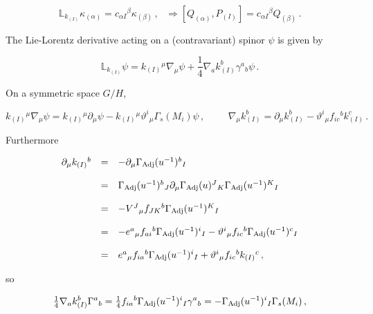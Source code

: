 \documentclass[12pt,a4paper]{article}
\begin{document}
\begin{equation}
\mathbb{L}_{k_{(I)}}\kappa_{(\alpha)}
=c_{\alpha I}{}^{\beta}\kappa_{(\beta)}\, ,  
\,\,\,\,
\Rightarrow
[Q_{(\alpha)},P_{(I)}]= c_{\alpha I}{}^{\beta} Q_{(\beta)}\, .
\end{equation}

The Lie-Lorentz derivative acting on a (contravariant) spinor $\psi$
is given by \cite{kn:Kos,kn:Kos2}

\begin{equation}
\mathbb{L}_{k_{(I)}}\psi = k_{(I)}{}^{\mu}\nabla_{\mu}\psi 
+{\textstyle\frac{1}{4}} \nabla_{a}k_{(I)}^{b}\gamma^{a}{}_{b}\psi\, .  
\end{equation}

\noindent
On a symmetric space $G/H$, 

\begin{equation}
k_{(I)}{}^{\mu}\nabla_{\mu}\psi = 
k_{(I)}{}^{\mu}\partial_{\mu}\psi -
k_{(I)}{}^{\mu}\vartheta^{i}{}_{\mu}\Gamma_{s}(M_{i})\psi\, ,
\hspace{1cm}
\nabla_{\mu}k_{(I)}^{b} = 
\partial_{\mu}k_{(I)}^{b} -\vartheta^{i}{}_{\mu}f_{ic}{}^{b}k_{(I)}^{c}\, .
\end{equation}

\noindent
Furthermore

\begin{equation}
  \begin{array}{rcl}
\partial_{\mu}k_{(I)}{}^{b} & = & 
-\partial_{\mu}\Gamma_{\rm Adj}(u^{-1})^{b}{}_{I} \\
& & \\
& = & 
\Gamma_{\rm Adj}(u^{-1})^{b}{}_{J}
\partial_{\mu}\Gamma_{\rm Adj}(u)^{J}{}_{K}
\Gamma_{\rm Adj}(u^{-1})^{K}{}_{I}  \\
& & \\
& = & -V^{J}{}_{\mu}f_{JK}{}^{b} \Gamma_{\rm Adj}(u^{-1})^{K}{}_{I}\\
& & \\
& = & -e^{a}{}_{\mu}f_{ai}{}^{b} \Gamma_{\rm Adj}(u^{-1})^{i}{}_{I}
-\vartheta^{i}{}_{\mu}f_{ic}{}^{b} \Gamma_{\rm Adj}(u^{-1})^{c}{}_{I}\\
& & \\
& = & 
e^{a}{}_{\mu}f_{ia}{}^{b} \Gamma_{\rm Adj}(u^{-1})^{i}{}_{I}
+\vartheta^{i}{}_{\mu}f_{ic}{}^{b} k_{(I)}{}^{c}\, ,\\
\end{array}
\end{equation}

\noindent 
so 

\begin{equation}
{\textstyle\frac{1}{4}} \nabla_{a}k_{(I)}^{b}\Gamma^{a}{}_{b}
={\textstyle\frac{1}{4}} f_{ia}{}^{b} \Gamma_{\rm Adj}(u^{-1})^{i}{}_{I}
\gamma^{a}{}_{b}= 
-\Gamma_{\rm Adj}(u^{-1})^{i}{}_{I}\Gamma_{s}(M_{i})\, ,
\end{equation}
\end{document}
